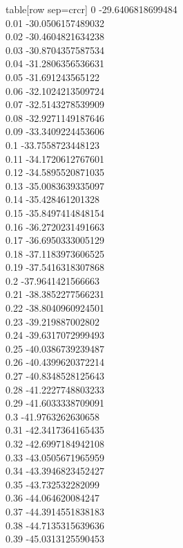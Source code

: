   table[row sep=crcr]{%
0	-29.6406818699484\\
0.01	-30.0506157489032\\
0.02	-30.4604821634238\\
0.03	-30.8704357587534\\
0.04	-31.2806356536631\\
0.05	-31.691243565122\\
0.06	-32.1024213509724\\
0.07	-32.5143278539909\\
0.08	-32.9271149187646\\
0.09	-33.3409224453606\\
0.1	-33.7558723448123\\
0.11	-34.1720612767601\\
0.12	-34.5895520871035\\
0.13	-35.0083639335097\\
0.14	-35.428461201328\\
0.15	-35.8497414848154\\
0.16	-36.2720231491663\\
0.17	-36.6950333005129\\
0.18	-37.1183973606525\\
0.19	-37.5416318307868\\
0.2	-37.9641421566663\\
0.21	-38.3852277566231\\
0.22	-38.8040960924501\\
0.23	-39.219887002802\\
0.24	-39.6317072999493\\
0.25	-40.0386739239487\\
0.26	-40.4399620372214\\
0.27	-40.8348528125643\\
0.28	-41.2227748803233\\
0.29	-41.6033338709091\\
0.3	-41.9763262630658\\
0.31	-42.3417364165435\\
0.32	-42.6997184942108\\
0.33	-43.0505671965959\\
0.34	-43.3946823452427\\
0.35	-43.732532282099\\
0.36	-44.064620084247\\
0.37	-44.3914551838183\\
0.38	-44.7135315639636\\
0.39	-45.0313125590453\\
}
